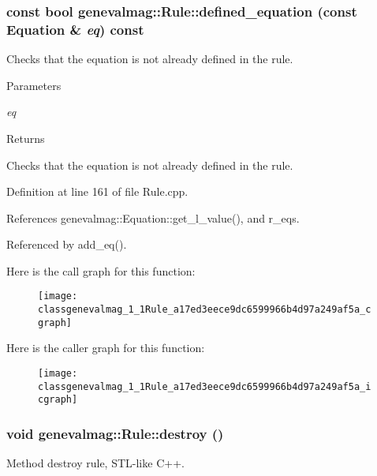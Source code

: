 \hypertarget{classgenevalmag_1_1Rule_a17ed3eece9dc6599966b4d97a249af5a}{
\subsubsection[{defined\_\-equation}]{\setlength{\rightskip}{0pt plus 5cm}const bool genevalmag::Rule::defined\_\-equation (const {\bf Equation} \& {\em eq}) const}}
\label{classgenevalmag_1_1Rule_a17ed3eece9dc6599966b4d97a249af5a}
Checks that the equation is not already defined in the rule. 
\begin{DoxyParams}{Parameters}
\item[{\em eq}]\end{DoxyParams}
\begin{DoxyReturn}{Returns}

\end{DoxyReturn}
Checks that the equation is not already defined in the rule. 

Definition at line 161 of file Rule.cpp.



References genevalmag::Equation::get\_\-l\_\-value(), and r\_\-eqs.



Referenced by add\_\-eq().



Here is the call graph for this function:\nopagebreak
\begin{figure}[H]
\begin{center}
\leavevmode
\texttt{[image: classgenevalmag\_1\_1Rule\_a17ed3eece9dc6599966b4d97a249af5a\_cgraph]}
\end{center}
\end{figure}




Here is the caller graph for this function:\nopagebreak
\begin{figure}[H]
\begin{center}
\leavevmode
\texttt{[image: classgenevalmag\_1\_1Rule\_a17ed3eece9dc6599966b4d97a249af5a\_icgraph]}
\end{center}
\end{figure}


\hypertarget{classgenevalmag_1_1Rule_a9089d3054bc30429fa27800720980df1}{
\subsubsection[{destroy}]{\setlength{\rightskip}{0pt plus 5cm}void genevalmag::Rule::destroy ()}}
\label{classgenevalmag_1_1Rule_a9089d3054bc30429fa27800720980df1}
Method destroy rule, STL-\/like C++. 

